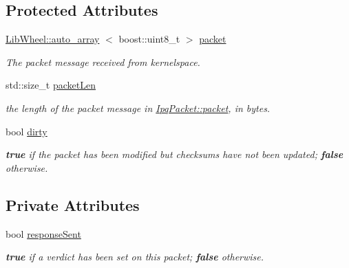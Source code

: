 \subsection*{\-Protected \-Attributes}
\begin{DoxyCompactItemize}
\item 
\hyperlink{classLibWheel_1_1auto__array}{\-Lib\-Wheel\-::auto\-\_\-array}\*
$<$ boost\-::uint8\-\_\-t $>$ \hyperlink{classIPQ_1_1IpqPacket_a2bdf247f13a3e9f86e9e3846e6a9cb45}{packet}
\begin{DoxyCompactList}\small\item\em \-The packet message received from kernelspace. \end{DoxyCompactList}\item 
std\-::size\-\_\-t \hyperlink{classIPQ_1_1IpqPacket_a9b448a070c5ae499e32d2af5a190b86d}{packet\-Len}
\begin{DoxyCompactList}\small\item\em the length of the packet message in \hyperlink{classIPQ_1_1IpqPacket_a2bdf247f13a3e9f86e9e3846e6a9cb45}{\-Ipq\-Packet\-::packet}, in bytes. \end{DoxyCompactList}\item 
bool \hyperlink{classIPQ_1_1IpqPacket_a00acebf51531043a8536f20bb9412d61}{dirty}
\begin{DoxyCompactList}\small\item\em {\bfseries true} if the packet has been modified but checksums have not been updated; {\bfseries false} otherwise. \end{DoxyCompactList}\end{DoxyCompactItemize}
\subsection*{\-Private \-Attributes}
\begin{DoxyCompactItemize}
\item 
bool \hyperlink{classIPQ_1_1IpqPacket_aa1a2044e8f04423ccc68a4c0a2142c6b}{response\-Sent}
\begin{DoxyCompactList}\small\item\em {\bfseries true} if a verdict has been set on this packet; {\bfseries false} otherwise. \end{DoxyCompactList}\end{DoxyCompactItemize}
